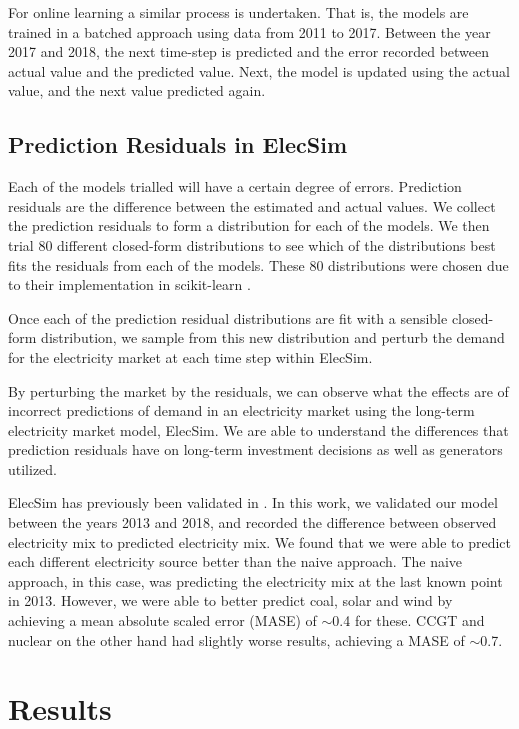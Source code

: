 \documentclass[final,3p,times,twocolumn,numbers]{elsarticle}
\begin{document}
For online learning a similar process is undertaken. That is, the models are trained in a batched approach using data from 2011 to 2017. Between the year 2017 and 2018, the next time-step is predicted and the error recorded between actual value and the predicted value. Next, the model is updated using the actual value, and the next value predicted again.


\subsection{Prediction Residuals in ElecSim}

Each of the models trialled will have a certain degree of errors. Prediction residuals are the difference between the estimated and actual values. We collect the prediction residuals to form a distribution for each of the models. We then trial 80 different closed-form distributions to see which of the distributions best fits the residuals from each of the models. These 80 distributions were chosen due to their implementation in scikit-learn \cite{scikit-learn}.

Once each of the prediction residual distributions are fit with a sensible closed-form distribution, we sample from this new distribution and perturb the demand for the electricity market at each time step within ElecSim.

By perturbing the market by the residuals, we can observe what the effects are of incorrect predictions of demand in an electricity market using the long-term electricity market model, ElecSim. We are able to understand the differences that prediction residuals have on long-term investment decisions as well as generators utilized.

ElecSim has previously been validated in \cite{Kell2020}. In this work, we validated our model between the years 2013 and 2018, and recorded the difference between observed electricity mix to predicted electricity mix. We found that we were able to predict each different electricity source better than the naive approach. The naive approach, in this case, was predicting the electricity mix at the last known point in 2013. However, we were able to better predict coal, solar and wind by achieving a mean absolute scaled error (MASE) of ${\sim}$0.4 for these. CCGT and nuclear on the other hand had slightly worse results, achieving a MASE of ${\sim}$0.7.



\section{Results}
\label{sec:results}
\end{document}
